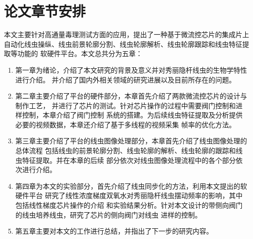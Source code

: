 \section{论文章节安排}
	本文主要针对高通量毒理测试方面的应用，提出了一种基于微流控芯片的集成片上
	自动化线虫操纵、线虫前景轮廓分割、线虫轮廓解析、线虫轮廓跟踪和线虫特征提取等功能的
	软硬件平台。本文总共分为五章：
	\begin{enumerate}
	  \item 第一章为绪论，介绍了本文研究的背景及意义并对秀丽隐杆线虫的生物学特性进行介绍。
	  并介绍了国内外相关领域的研究进展以及目前所存在的问题。
	  \item 第二章主要介绍了平台的硬件部分，本章首先介绍了两款微流控芯片的设计与制作工艺，
	  并进行了芯片的测试。针对芯片操作的过程中需要阀门控制和进样控制，本章介绍了阀门控制
	  系统的搭建。为后续线虫特征提取及分析提供必要的视频数据，本章还介绍了基于多线程的视频采集
	  帧率的优化方法。
	  \item 第三章主要介绍了平台的线虫图像处理部分，本章首先介绍了线虫图像处理的总体流程
	  包括线虫的前景轮廓分割、线虫轮廓的解析、线虫轮廓的跟踪和线虫特征提取。并在本章的后续
	  部分依次对线虫图像处理流程中的各个部分依次进行介绍。
	  \item 第四章为本文的实验部分，首先介绍了线虫同步化的方法，利用本文提出的软硬件平台
	  研究了线性浓度梯度双氧水对秀丽隐杆线虫摆动频率的影响，其中包括线性梯度芯片操作的介绍
	  和实验结果分析。针对本文设计的带侧向阀门的线虫培养线虫，研究了芯片的侧向阀门对线虫
	  进样的控制。
	  \item 第五章主要对本文的工作进行总结，并指出了下一步的研究内容。
	\end{enumerate}
\label{sec:intro:org}










